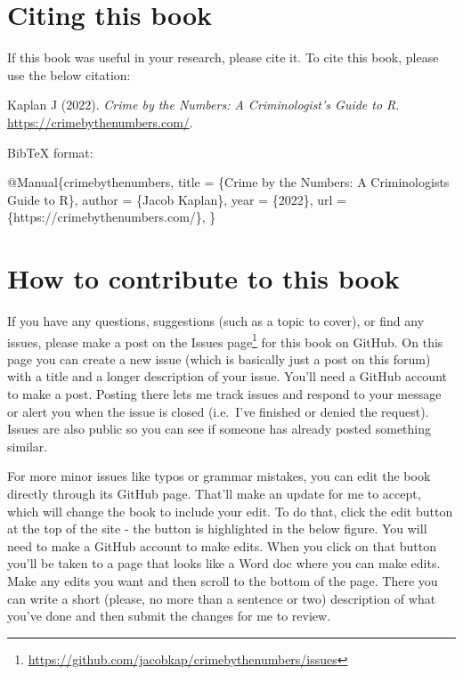 \documentclass[
]{krantz}
\makeatletter
\newenvironment{Shaded}{\begin{snugshade}}{\end{snugshade}}
\newcommand{\DataTypeTok}[1]{\textcolor[rgb]{0.27,0.27,0.27}{#1}}
\newcommand{\NormalTok}[1]{#1}
\newcommand{\OtherTok}[1]{\textcolor[rgb]{0.37,0.37,0.37}{#1}}
\newcommand{\VariableTok}[1]{\textcolor[rgb]{0,0,0}{#1}}
\renewcommand{\href}[2]{#2\footnote{\url{#1}}}
\newenvironment{kframe}{%
\medskip{}
\setlength{\fboxsep}{.8em}
 \def\at@end@of@kframe{}%
 \ifinner\ifhmode%
  \def\at@end@of@kframe{\end{minipage}}%
  \begin{minipage}{\columnwidth}%
 \fi\fi%
 \def\FrameCommand##1{\hskip\@totalleftmargin \hskip-\fboxsep
 \colorbox{shadecolor}{##1}\hskip-\fboxsep
     \hskip-\linewidth \hskip-\@totalleftmargin \hskip\columnwidth}%
 \MakeFramed {\advance\hsize-\width
   \@totalleftmargin\z@ \linewidth\hsize
   \@setminipage}}%
 {\par\unskip\endMakeFramed%
 \at@end@of@kframe}
\renewenvironment{Shaded}{\begin{kframe}}{\end{kframe}}
\makeatother
\begin{document}
\hypertarget{citing-this-book}{%
\section*{Citing this book}\label{citing-this-book}}


If this book was useful in your research, please cite it. To
cite this book, please use the below citation:

Kaplan J (2022). \emph{Crime by the Numbers: A
Criminologist's Guide to R}.
\url{https://crimebythenumbers.com/}.

BibTeX format:

\begin{Shaded}
\begin{Highlighting}[]
\VariableTok{@Manual}\NormalTok{\{}\OtherTok{crimebythenumbers}\NormalTok{,}
  \DataTypeTok{title}\NormalTok{ = \{Crime by the Numbers: A Criminologist\textquotesingle{}s Guide to R\},}
  \DataTypeTok{author}\NormalTok{ = \{Jacob Kaplan\},}
  \DataTypeTok{year}\NormalTok{ = \{2022\},}
  \DataTypeTok{url}\NormalTok{ = \{https://crimebythenumbers.com/\},}
\NormalTok{\}}
\end{Highlighting}
\end{Shaded}

\hypertarget{how-to-contribute-to-this-book}{%
\section*{How to contribute to this
book}\label{how-to-contribute-to-this-book}}

If you have any questions, suggestions (such as a topic to
cover), or find any issues, please make a post on the
\href{https://github.com/jacobkap/crimebythenumbers/issues}{Issues
page} for this book on GitHub. On this page you can create a
new issue (which is basically just a post on this forum)
with a title and a longer description of your issue. You'll
need a GitHub account to make a post. Posting there lets me
track issues and respond to your message or alert you when
the issue is closed (i.e.~I've finished or denied the
request). Issues are also public so you can see if someone
has already posted something similar.

For more minor issues like typos or grammar mistakes, you
can edit the book directly through its GitHub page. That'll
make an update for me to accept, which will change the book
to include your edit. To do that, click the edit button at
the top of the site - the button is highlighted in the below
figure. You will need to make a GitHub account to make
edits. When you click on that button you'll be taken to a
page that looks like a Word doc where you can make edits.
Make any edits you want and then scroll to the bottom of the
page. There you can write a short (please, no more than a
sentence or two) description of what you've done and then
submit the changes for me to review.
\end{document}
